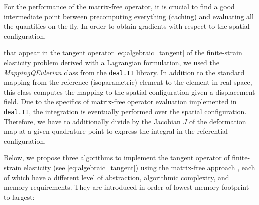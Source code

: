 \documentclass[times,doublespace]{nmeauth}
\newcommand{\changeDD}[1]{#1}
\newcommand{\changeJP}[1]{#1}
\begin{document}
\changeDD{For the performance of the matrix-free operator, it is crucial to find a good intermediate point between precomputing everything (caching) and evaluating all the quantities on-the-fly.}
%
In order to obtain gradients with respect to the spatial configuration,
\changeDD{
that appear in the tangent operator \eqref{eq:algebraic_tangent} of the finite-strain elasticity problem \changeJP{derived with a Lagrangian formulation},}
we used the \textit{MappingQEulerian} class from the \texttt{deal.II} \cite{dealII90} library.
In addition to the standard mapping from the reference (isoparametric) element to the element in real space, this class computes the mapping to the spatial configuration given a displacement field.
%
Due to the specifics of matrix-free operator evaluation implemented in \texttt{deal.II}, the integration is eventually performed over the spatial configuration.
Therefore, we have to additionally divide by the Jacobian $J$ of the deformation map at a given quadrature point to express the integral in the referential configuration.

\changeDD{
Below, we propose three algorithms to implement the tangent operator of finite-strain elasticity (see \eqref{eq:algebraic_tangent}) using the matrix-free approach \changeJP{, each of which have a different level of abstraction, algorithmic complexity, and memory requirements}.
\changeJP{They are introduced in order of lowest memory footprint to largest:}
}
\end{document}

